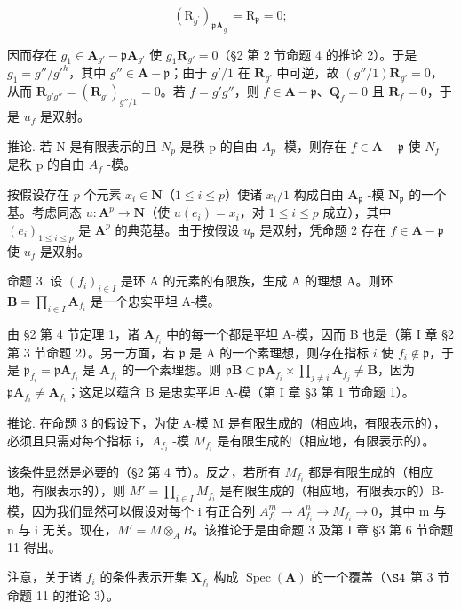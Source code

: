 \[
\left(\mathrm{R} _ {g ^ {\prime}}\right) _ {\mathfrak{p}\mathbf{A}_{g ^ {\prime}}} = \mathrm{R} _ {\mathfrak{p}} = 0;
\]

因而存在 \(g_1 \in \mathbf{A}_{g'} - \mathfrak{p}\mathbf{A}_{g'}\) 使 \(g_1\mathbf{R}_{g'} = 0\)（§2 第 2 节命题 4 的推论 2）。于是 \(g_1 = g'' / g'^h\)，其中 \(g'' \in \mathbf{A} - \mathfrak{p}\)；由于 \(g' / 1\) 在 \(\mathbf{R}_{g'}\) 中可逆，故 \((g'' / 1)\mathbf{R}_{g'} = 0\)，从而 \(\mathbf{R}_{g'g''} = (\mathbf{R}_{g'})_{g'' / 1} = 0\)。若 \(f = g'g''\)，则 \(f \in \mathbf{A} - \mathfrak{p}\)、\(\mathbf{Q}_f = 0\) 且 \(\mathbf{R}_f = 0\)，于是 \(u_f\) 是双射。

推论. 若 N 是有限表示的且 \(N_{p}\) 是秩 p 的自由 \(A_{p}\) -模，则存在 \(f \in \mathbf{A} - \mathfrak{p}\) 使 \(N_{f}\) 是秩 p 的自由 \(A_{f}\) -模。

按假设存在 \(p\) 个元素 \(x_{i} \in \mathbf{N}\)（\(1 \leqslant i \leqslant p\)）使诸 \(x_{i}/1\) 构成自由 \(\mathbf{A}_{\mathfrak{p}}\) -模 \(\mathbf{N}_{\mathfrak{p}}\) 的一个基。考虑同态 \(u: \mathbf{A}^p \to \mathbf{N}\)（使 \(u(e_{i}) = x_{i}\)，对 \(1 \leqslant i \leqslant p\) 成立），其中 \((e_{i})_{1 \leqslant i \leqslant p}\) 是 \(\mathbf{A}^p\) 的典范基。由于按假设 \(u_{\mathfrak{p}}\) 是双射，凭命题 2 存在 \(f \in \mathbf{A} - \mathfrak{p}\) 使 \(u_{f}\) 是双射。

命题 3. 设 \((f_{i})_{i\in I}\) 是环 A 的元素的有限族，生成 A 的理想 A。则环 \(\mathbf{B} = \prod_{i\in I}\mathbf{A}_{f_i}\) 是一个忠实平坦 A-模。

由 §2 第 4 节定理 1，诸 \(\mathbf{A}_{f_i}\) 中的每一个都是平坦 A-模，因而 B 也是（第 I 章 §2 第 3 节命题 2）。另一方面，若 \(\mathfrak{p}\) 是 A 的一个素理想，则存在指标 \(i\) 使 \(f_i \notin \mathfrak{p}\)，于是 \(\mathfrak{p}_{f_i} = \mathfrak{p} \mathbf{A}_{f_i}\) 是 \(\mathbf{A}_{f_i}\) 的一个素理想。则 \(\mathfrak{p} \mathbf{B} \subset \mathfrak{p} \mathbf{A}_{f_i} \times \prod_{j \neq i} \mathbf{A}_{f_j} \neq \mathbf{B}\)，因为 \(\mathfrak{p} \mathbf{A}_{f_i} \neq \mathbf{A}_{f_i}\)；这足以蕴含 B 是忠实平坦 A-模（第 I 章 §3 第 1 节命题 1）。

推论. 在命题 3 的假设下，为使 A-模 M 是有限生成的（相应地，有限表示的），必须且只需对每个指标 i，\(A_{f_{i}}\) -模 \(M_{f_{i}}\) 是有限生成的（相应地，有限表示的）。

该条件显然是必要的（§2 第 4 节）。反之，若所有 \(M_{f_{i}}\) 都是有限生成的（相应地，有限表示的），则 \(M' = \prod_{i \in I} M_{f_{i}}\) 是有限生成的（相应地，有限表示的）B-模，因为我们显然可以假设对每个 i 有正合列 \(A_{f_i}^{m} \to A_{f_i}^{n} \to M_{f_i} \to 0\)，其中 m 与 n 与 i 无关。现在，\(M' = M \otimes_{A} B\)。该推论于是由命题 3 及第 I 章 §3 第 6 节命题 11 得出。

注意，关于诸 \(f_{i}\) 的条件表示开集 \(\mathbf{X}_{f_{i}}\) 构成 \(\operatorname{Spec}(\mathbf{A})\) 的一个覆盖（\(\S 4\) 第 3 节命题 11 的推论 3）。

